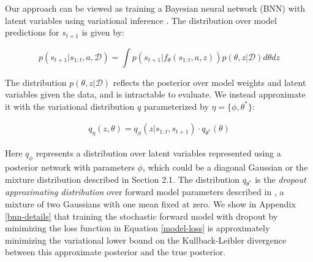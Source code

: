 \documentclass{article} %
\begin{document}
Our approach can be viewed as training a Bayesian neural network (BNN) \citep{Neal1995} with latent variables using variational inference \citep{Jordan1999, VAE}. 
The distribution over model predictions for $s_{t+1}$ is given by:

\begin{equation*}
  p(s_{t+1} | s_{1:t}, a, \mathcal{D}) = \int p(s_{t+1} | f_\theta(s_{1:t}, a, z)) p(\theta, z | \mathcal{D}) d\theta dz
\end{equation*}

The distribution $p(\theta, z | \mathcal{D})$ reflects the posterior over model weights and latent variables given the data, and is intractable to evaluate.
We instead approximate it with the variational distribution $q$ parameterized by $\eta = \{\phi, \theta^*\}$:

\begin{align*}
  q_\eta(z, \theta) = q_\phi(z | s_{1:t}, s_{t+1}) \cdot q_{\theta^*}(\theta)
\end{align*}

Here $q_\phi$ represents a distribution over latent variables represented using a posterior network with parameters $\phi$, which could be a diagonal Gaussian or the mixture distribution described in Section 2.1.
The distribution $q_{\theta^*}$ is the \textit{dropout approximating distribution} over forward model parameters described in \citep{Gal16}, a mixture of two Gaussians with one mean fixed at zero.
We show in Appendix \ref{bnn-details} that training the stochastic forward model with dropout by minimizing the loss function in Equation \ref{model-loss} is approximately minimizing the variational lower bound on the Kullback-Leibler divergence between this approximate posterior and the true posterior.
\end{document}
